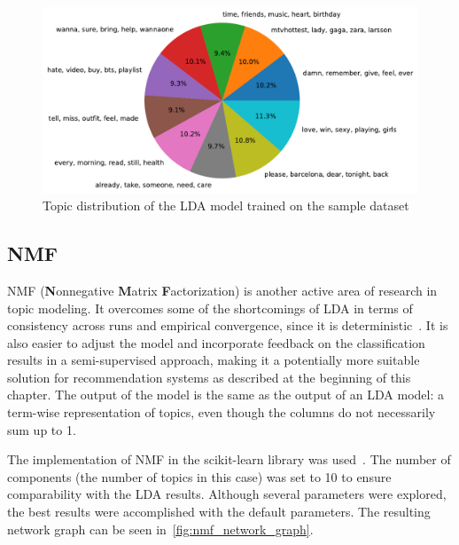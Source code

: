 \begin{figure}
    \centering
    \caption{Topic distribution of the LDA model trained on the sample dataset}
    \label{fig:sample_topic_distribution}
    \includegraphics[width=\textwidth]{../figures/topic_distribution.pdf}
\end{figure}

\subsection{NMF}
\label{subsec:nmf}

NMF (\textbf{N}onnegative \textbf{M}atrix \textbf{F}actorization) is another active area of research in topic modeling.
It overcomes some of the shortcomings of LDA in terms of consistency across runs and empirical convergence,
since it is deterministic~\cite{Choo2013}.
It is also easier to adjust the model and incorporate feedback on the classification results in a semi-supervised approach,
making it a potentially more suitable solution for recommendation systems as described at the beginning of this chapter.
The output of the model is the same as the output of an LDA model: a term-wise representation of topics, even though the columns
do not necessarily sum up to 1.

The implementation of NMF in the scikit-learn library was used~\cite{scikitDocs}.
The number of components (the number of topics in this case) was set to 10 to ensure comparability with the LDA results.
Although several parameters were explored, the best results were accomplished with the default parameters.
The resulting network graph can be seen in~\cref{fig:nmf_network_graph}.

